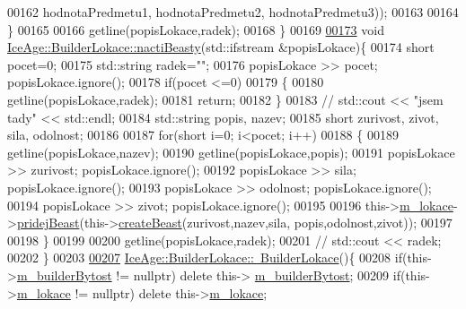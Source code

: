 \begin{DoxyCode}
00162                                                     hodnotaPredmetu1, hodnotaPredmetu2, hodnotaPredmetu3));
00163 
00164     \}
00165 
00166     getline(popisLokace,radek); 
00168 \}
00169 
\hypertarget{BuilderLokace_8cpp_source.tex_l00173}{}\hyperlink{classIceAge_1_1BuilderLokace_a8424c61902a53f9304460055f478601b}{00173} \textcolor{keywordtype}{void} \hyperlink{classIceAge_1_1BuilderLokace_a8424c61902a53f9304460055f478601b}{IceAge::BuilderLokace::nactiBeasty}(std::ifstream &popisLokace)\{
00174     \textcolor{keywordtype}{short} pocet=0;
00175     std::string radek=\textcolor{stringliteral}{""};
00176     popisLokace >> pocet; popisLokace.ignore();
00178     \textcolor{keywordflow}{if}(pocet <=0)
00179     \{
00180         getline(popisLokace,radek);
00181         \textcolor{keywordflow}{return};
00182     \}
00183 \textcolor{comment}{//    std::cout << "jsem tady" << std::endl;}
00184     std::string popis, nazev;
00185     \textcolor{keywordtype}{short} zurivost, zivot, sila, odolnost;
00186 
00187     \textcolor{keywordflow}{for}(\textcolor{keywordtype}{short} i=0; i<pocet; i++)
00188     \{
00189         getline(popisLokace,nazev);
00190         getline(popisLokace,popis);
00191         popisLokace >> zurivost;            popisLokace.ignore();
00192         popisLokace >> sila;                popisLokace.ignore();
00193         popisLokace >> odolnost;            popisLokace.ignore();
00194         popisLokace >> zivot;               popisLokace.ignore();
00195 
00196         this->\hyperlink{classIceAge_1_1BuilderLokace_aad0fb17bf38c03cd767e100758348f24}{m\_lokace}->\hyperlink{classIceAge_1_1Lokace_ae77a73c9d4ca11a4ccbd056e80e68318}{pridejBeast}(this->\hyperlink{classIceAge_1_1BuilderLokace_a6ce9f158876a0601a3bac0cc26ed2d46}{createBeast}(zurivost,nazev,sila,
      popis,odolnost,zivot));
00197 
00198     \}
00199 
00200     getline(popisLokace,radek);
00201 \textcolor{comment}{//    std::cout << radek;}
00202 \}
00203 
\hypertarget{BuilderLokace_8cpp_source.tex_l00207}{}\hyperlink{classIceAge_1_1BuilderLokace_ae90ede622f89433692f5d4c17fd35ffb}{00207} \hyperlink{classIceAge_1_1BuilderLokace_ae90ede622f89433692f5d4c17fd35ffb}{IceAge::BuilderLokace::~BuilderLokace}()\{
00208     \textcolor{keywordflow}{if}(this->\hyperlink{classIceAge_1_1BuilderLokace_ac6981c43c22713d56e7ccbefa8b5c8b4}{m\_builderBytost} != \textcolor{keyword}{nullptr}) \textcolor{keyword}{delete} this->
      \hyperlink{classIceAge_1_1BuilderLokace_ac6981c43c22713d56e7ccbefa8b5c8b4}{m\_builderBytost};
00209     \textcolor{keywordflow}{if}(this->\hyperlink{classIceAge_1_1BuilderLokace_aad0fb17bf38c03cd767e100758348f24}{m\_lokace} != \textcolor{keyword}{nullptr}) \textcolor{keyword}{delete} this->\hyperlink{classIceAge_1_1BuilderLokace_aad0fb17bf38c03cd767e100758348f24}{m\_lokace};

\end{DoxyCode}
